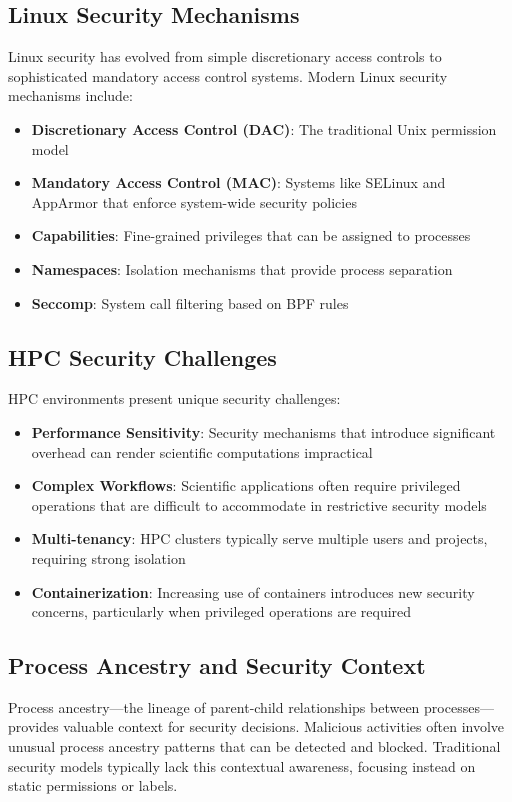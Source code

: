 \documentclass[conference]{IEEEtran}
\begin{document}
\subsection{Linux Security Mechanisms}
Linux security has evolved from simple discretionary access controls to sophisticated mandatory access control systems. Modern Linux security mechanisms include:

\begin{itemize}
\item \textbf{Discretionary Access Control (DAC)}: The traditional Unix permission model
\item \textbf{Mandatory Access Control (MAC)}: Systems like SELinux and AppArmor that enforce system-wide security policies
\item \textbf{Capabilities}: Fine-grained privileges that can be assigned to processes
\item \textbf{Namespaces}: Isolation mechanisms that provide process separation
\item \textbf{Seccomp}: System call filtering based on BPF rules
\end{itemize}

\subsection{HPC Security Challenges}
HPC environments present unique security challenges:

\begin{itemize}
\item \textbf{Performance Sensitivity}: Security mechanisms that introduce significant overhead can render scientific computations impractical
\item \textbf{Complex Workflows}: Scientific applications often require privileged operations that are difficult to accommodate in restrictive security models
\item \textbf{Multi-tenancy}: HPC clusters typically serve multiple users and projects, requiring strong isolation
\item \textbf{Containerization}: Increasing use of containers introduces new security concerns, particularly when privileged operations are required
\end{itemize}

\subsection{Process Ancestry and Security Context}
Process ancestry—the lineage of parent-child relationships between processes—provides valuable context for security decisions. Malicious activities often involve unusual process ancestry patterns that can be detected and blocked. Traditional security models typically lack this contextual awareness, focusing instead on static permissions or labels.
\end{document}

